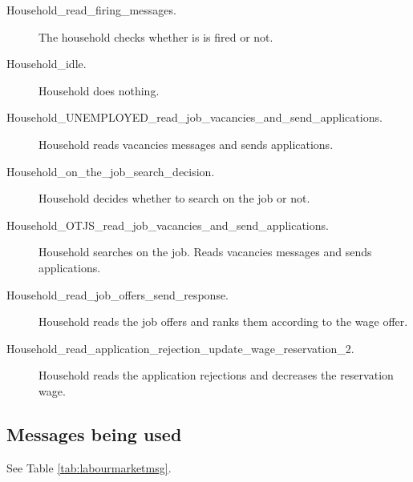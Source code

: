 \begin{description}
\item[Household\_read\_firing\_messages.] The household checks whether is is fired or
 not.
\item[Household\_idle.] Household does nothing.
\item[Household\_UNEMPLOYED\_read\_job\_vacancies\_and\_send\_applications.] Household reads vacancies messages and sends applications.
\item[Household\_on\_the\_job\_search\_decision.] Household decides whether to search on the job or not.
\item[Household\_OTJS\_read\_job\_vacancies\_and\_send\_applications.] Household
searches on the job. Reads vacancies messages and sends
applications.
\item[Household\_read\_job\_offers\_send\_response.] Household reads the job offers and ranks them
according to the wage offer.
\item[Household\_read\_application\_rejection\_update\_wage\_reservation\_2.] Household reads the application rejections and decreases the
reservation wage.
\end{description}




\subsection{Messages being used}

See Table \ref{tab:labourmarketmsg}.

